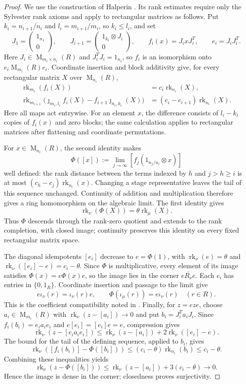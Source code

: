 \documentclass[11pt]{amsart}
\DeclareMathOperator{\rk}{rk}
\DeclareMathOperator{\Mat}{M}
\theoremstyle{definition}
\theoremstyle{remark}
\begin{document}
\begin{proof}
We use the construction of Halperin \cite[Lemma~1]{Halperin1968}.  Its rank estimates require only the
Sylvester rank axioms and apply to rectangular matrices as follows.
Put $k_i=n_{i+1}/n_i$ and $l_i=m_{i+1}/m_i$, so $k_i\leq l_i$, and set
\[
 J_1=\begin{pmatrix}1_{n_1}\\0\end{pmatrix},\qquad
 J_{i+1}=\begin{pmatrix}1_{k_i}\otimes J_i\\0\end{pmatrix},\qquad
 f_i(x)=J_ixJ_i^T,\qquad e_i=J_iJ_i^T.
\]
Here $J_i\in\Mat_{m_i\times n_i}(R)$ and $J_i^TJ_i=1_{n_i}$, so
$f_i$ is an isomorphism onto $e_i\Mat_{m_i}(R)e_i$.
Coordinate insertion and block additivity give, for every rectangular
matrix $X$ over $\Mat_{n_i}(R)$,
\[
 \begin{aligned}
 \rk_{m_i}(f_i(X))&=c_i\rk_{n_i}(X),\\
 \rk_{m_{i+1}}\bigl(
 \jmath_{m_i,l_i}f_i(X)-f_{i+1}\jmath_{n_i,k_i}(X)\bigr)
 &=(c_i-c_{i+1})\rk_{n_i}(X).
 \end{aligned}
\]
Here all maps act entrywise.  For an element $x$, the difference
consists of $l_i-k_i$ copies of $f_i(x)$ and zero blocks; the same
calculation applies to rectangular matrices after flattening and
coordinate permutations.

For $x\in\Mat_{n_i}(R)$, the second identity makes
\[
 \Phi([x]):=\lim_{j\to\infty}
 [f_j(1_{n_j/n_i}\otimes x)]
\]
well defined: the rank distance between the terms indexed by $h$ and
$j>h\geq i$ is at most $(c_h-c_j)\rk_{n_i}(x)$.
Changing a stage representative leaves the tail of this sequence unchanged.
Continuity of addition and multiplication therefore gives a ring
homomorphism on the algebraic limit.  The first identity gives
\[
 \rk_\nu(\Phi(X))=\theta\rk_\mu(X).
\]
Thus $\Phi$ descends through the rank-zero quotient and extends to the
rank completion, with closed image; continuity preserves this
identity on every fixed rectangular matrix space.

The diagonal idempotents $[e_i]$ decrease to $e=\Phi(1)$, with
$\rk_\nu(e)=\theta$ and $\rk_\nu([e_i]-e)=c_i-\theta$.
Since $\Phi$ is multiplicative, every element of its image satisfies
$\Phi(x)=e\Phi(x)e$, so the image lies in the corner
$e\overline{R_\nu}e$.
Each $e_i$ has entries in $\{0,1_R\}$.  Coordinate insertion and
passage to the limit give
\[
 e\iota_\nu(r)=\iota_\nu(r)e,\qquad
 \Phi(\iota_\mu(r))=e\iota_\nu(r)\quad(r\in R).
\]
This is the coefficient compatibility noted in
\cite[Remark~1]{Halperin1968}.
Finally, for $z=eze$, choose $a_i\in\Mat_{m_i}(R)$ with
$\rk_\nu(z-[a_i])\to0$ and put $b_i=J_i^Ta_iJ_i$.
Since $f_i(b_i)=e_ia_ie_i$ and $e[e_i]=[e_i]e=e$, compression gives
\[
 \rk_\nu(z-[e_ia_ie_i])
 \leq\rk_\nu(z-[a_i])+2\rk_\nu([e_i]-e).
\]
The bound for the tail of the defining sequence, applied to $b_i$, gives
\[
 \rk_\nu([f_i(b_i)]-\Phi([b_i]))
 \leq(c_i-\theta)\rk_{n_i}(b_i)\leq c_i-\theta.
\]
Combining these inequalities yields
\[
 \rk_\nu(z-\Phi([b_i]))
 \leq\rk_\nu(z-[a_i])+3(c_i-\theta)\longrightarrow0.
\]
Hence the image is dense in the corner; closedness proves surjectivity.
\end{proof}
\end{document}
